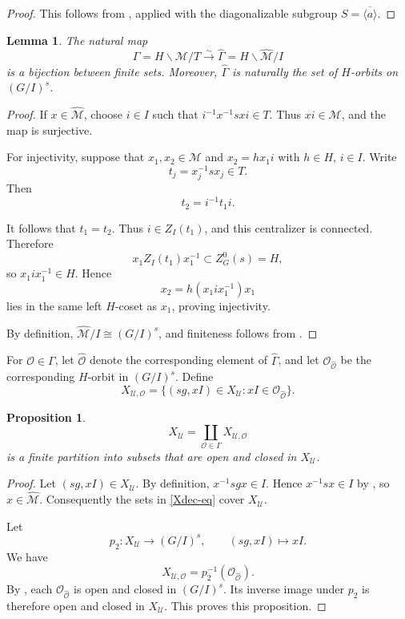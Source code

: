 \documentclass[11pt,letterpaper]{amsart}
\newtheorem{proposition}[theorem]{Proposition}
\newtheorem{lemma}[theorem]{Lemma}
\theoremstyle{definition}
\numberwithin{equation}{section}
\numberwithin{theorem}{section}
\begin{document}
\begin{proof}
This follows from \cite[Theorem A]{Richardson_1982}, applied with the
diagonalizable subgroup $S=\overline{\langle a\rangle}$.
\end{proof}


\begin{lemma}\label{lem4.2}
The natural map
\begin{equation*}
\Gamma=H\backslash\mathcal M/T
   \xrightarrow{\sim}
\widehat\Gamma=H\backslash\widehat{\mathcal M}/I        
\end{equation*}
is a bijection between finite sets. Moreover, \(\widehat\Gamma\) is
naturally the set of \(H\)-orbits on \((G/I)^s\).
\end{lemma}

\begin{proof}
If \(x\in\widehat{\mathcal M}\), choose \(i\in I\) such that
\(i^{-1}x^{-1}sxi\in T\). Thus \(xi\in\mathcal M\), and the map is
surjective.

For injectivity, suppose that \(x_1,x_2\in\mathcal M\) and
\(x_2=h x_1 i\) with \(h\in H\), \(i\in I\). Write
\[
t_j=x_j^{-1}sx_j\in T.
\]
 Then
\[
t_2=i^{-1}t_1i.
\]

It follows that \(t_1=t_2\). Thus \(i\in Z_I(t_1)\), and this centralizer
is connected. Therefore
\[
x_1Z_I(t_1)x_1^{-1}\subset Z^0_G(s)=H,
\]
so \(x_1ix_1^{-1}\in H\). Hence
\[
x_2=h(x_1ix_1^{-1})x_1
\]
lies in the same left \(H\)-coset as \(x_1\), proving injectivity.

By definition, $\widehat{\mathcal M}/I\cong(G/I)^s$, and finiteness
follows from .
\end{proof}
For $\mathcal O\in\Gamma$, let $\widehat{\mathcal O}$ denote the
corresponding element of $\widehat\Gamma$, and let
$\mathscr O_{\widehat{\mathcal O}}$ be the corresponding $H$-orbit in
$(G/I)^s$.  Define
\[X_{\mathcal U,{\mathcal O}}
 =\{(sg,xI)\in X_{\mathcal U}:
       xI\in\mathscr O_{\widehat{\mathcal O}}\}.\]
\begin{proposition}\label{Xdec}
\begin{equation}\label{Xdec-eq}
X_{\mathcal U}
 =\coprod_{{\mathcal O}\in\Gamma}
   X_{\mathcal U,{\mathcal O}}             
\end{equation}
is a finite partition into subsets that are open and closed in
\(X_{\mathcal U}\). 
\end{proposition}

\begin{proof}
Let \((sg,xI)\in X_{\mathcal U}\). By definition,
\(x^{-1}sgx\in I\). Hence \(x^{-1}sx\in I\) by , so
\(x\in\widehat{\mathcal M}\). Consequently the sets in
\eqref{Xdec-eq} cover
\(X_{\mathcal U}\).

Let
\[
p_2:X_{\mathcal U}\longrightarrow (G/I)^s,
\qquad (sg,xI)\longmapsto xI.
\]
We have
\[X_{\mathcal U,\mathcal O}
   =p_2^{-1}(\mathscr O_{\widehat{\mathcal O}}). \]
By , each
$\mathscr O_{\widehat{\mathcal O}}$ is open and closed in $(G/I)^s$.
Its inverse image under $p_2$ is therefore open and closed in
$X_{\mathcal U}$. This proves this proposition.
\end{proof}
\end{document}
